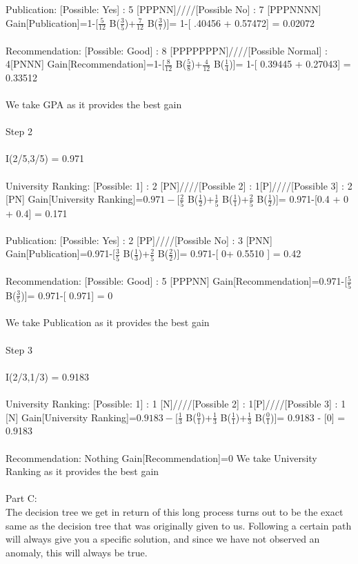 \documentclass{article}
\begin{document}
{\large Publication:} [Possible: Yes] : 5 [PPPNN]////[Possible No] : 7 [PPPNNNN]
Gain[Publication]=1-[$\frac{5}{12}$ B($\frac{3}{5}$)+$\frac{7}{12}$ B($\frac{3}{7}$)]= 1-[ .40456 + 0.57472] = 0.02072
\\
\\
{\large Recommendation:} [Possible: Good] : 8 [PPPPPPPN]////[Possible Normal] : 4[PNNN]
Gain[Recommendation]=1-[$\frac{8}{12}$ B($\frac{5}{8}$)+$\frac{4}{12}$ B($\frac{1}{4}$)]= 1-[ 0.39445 + 0.27043] = 0.33512
\\
\\
We take GPA as it provides the best gain
\\
\\
{\LARGE Step 2}
\\
\\
I(2/5,3/5) = 0.971
\\
\\
{\large University Ranking:} [Possible: 1] : 2 [PN]////[Possible 2] : 1[P]////[Possible 3] : 2 [PN]
Gain[University Ranking]=$0.971-$[$\frac{2}{5}$ B($\frac{1}{2}$)+$\frac{1}{5}$ B($\frac{1}{1}$)+$\frac{2}{5}$ B($\frac{1}{2}$)]= 0.971-[0.4 + 0 + 0.4] = 0.171
\\
\\
{\large Publication:} [Possible: Yes] : 2 [PP]////[Possible No] : 3 [PNN]
Gain[Publication]=0.971-[$\frac{3}{5}$ B($\frac{1}{3}$)+$\frac{2}{5}$ B($\frac{2}{2}$)]= 0.971-[ 0+ 0.5510 ] = 0.42
\\
\\
{\large Recommendation:} [Possible: Good] : 5 [PPPNN]
Gain[Recommendation]=0.971-[$\frac{5}{5}$ B($\frac{3}{5}$)]= 0.971-[ 0.971] = 0
\\
\\
We take Publication as it provides the best gain
\\
\\
{\LARGE Step 3}
\\
\\
I(2/3,1/3) = 0.9183
\\
\\
{\large University Ranking:} [Possible: 1] : 1 [N]////[Possible 2] : 1[P]////[Possible 3] : 1 [N]
Gain[University Ranking]=$0.9183-$[$\frac{1}{3}$ B($\frac{0}{1}$)+$\frac{1}{3}$ B($\frac{1}{1}$)+$\frac{1}{3}$ B($\frac{0}{1}$)]= 0.9183 - [0] = 0.9183
\\
\\
{\large Recommendation:} Nothing
Gain[Recommendation]=0
We take University Ranking as it provides the best gain
\\
\\
{\large Part C:}
\\
The decision tree we get in return of this long process turns out to be the exact same as the decision tree that was originally given to us. Following a certain path will always give you a specific solution, and since we have not observed an anomaly, this will always be true.
\end{document}
